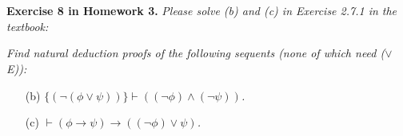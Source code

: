 \documentclass[12pt,a4paper]{article}
\theoremstyle{plain}
\begin{document}
\ \\
\ \\
\textbf{Exercise 8 in Homework 3.}
\textit{Please solve (b) and (c) in Exercise 2.7.1 in the textbook:}

\textit{Find natural deduction proofs of the following sequents (none of which need ($\vee$E)):}
%
\begin{enumerate}

\item[(b)] \textit{$\{ ( \neg ( \phi \vee \psi ) ) \} \vdash ( ( \neg \phi ) \wedge ( \neg \psi ) )$.}

\item[(c)] \textit{$\vdash ( \phi \rightarrow \psi ) \rightarrow ( ( \neg \phi ) \vee \psi )$.}

\end{enumerate}
\end{document}
